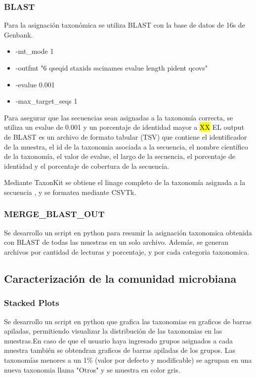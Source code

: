 \subsubsection{BLAST}
Para la asignación taxonómica se utiliza BLAST con la base de datos de 16s de Genbank.
\begin{itemize}
    \item -mt\_mode 1
    \item -outfmt "6 qseqid staxids sscinames evalue length pident qcovs"
    \item -evalue 0.001
    \item -max\_target\_seqs 1
\end{itemize}
Para asegurar que las secuencias sean asignadas a la taxonomía correcta, se utiliza un evalue de 0.001 y un porcentaje de identidad mayor a \hl{XX}
EL output de BLAST es un archivo de formato tabular (TSV) que contiene el identificador de la muestra, el id de la taxonomia asociada a la secuencia, el nombre científico de la taxonomía, el valor de evalue, el largo de la secuencia, el porcentaje de identidad y el porcentaje de cobertura de la secuencia.

Mediante TaxonKit se obtiene el linage completo de la taxonomía asignada a la secuencia , y se formatea mediante CSVTk.

\subsubsection{MERGE\_BLAST\_OUT}
Se desarrollo un script en python para resumir la asignación taxonomica obtenida con BLAST de todas las muestras en un solo archivo. Además, se generan archivos por cantidad de lecturas y porcentaje, y por cada categoria taxonomica.

\subsection{Caracterización de la comunidad microbiana}
\subsubsection{Stacked Plots}
Se desarrollo un script en python que grafica las taxonomias en graficos de barras apiladas, permitiendo visualizar la distribución de las taxonomias en las muestras.En caso de que el usuario haya ingresado grupos asignados a cada muestra también se obtendran graficos de barras apiladas de los grupos. Las taxonomías menores a un 1\% (valor por defecto y modificable) se agrupan en una nueva taxonomia llama "Otros" y se muestra en color gris.

